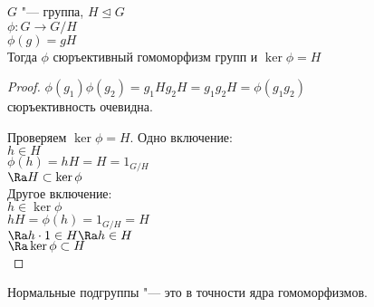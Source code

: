\begin{theorem}
$G$ "--- группа, $H \unlhd G$\\
$\phi \colon G \to G / H$\\
$\phi(g) = gH$ \\

Тогда $\phi$ сюръективный гомоморфизм групп и  $\ker \phi = H$\\
\end{theorem}
\begin{proof}
$\phi(g_1)\phi(g_2) = g_1Hg_2H = g_1g_2H = \phi(g_1g_2)$\\
сюръективность очевидна. 

Проверяем $\ker \phi = H$.
Одно включение:\\
$h \in H$\\
$\phi(h) = hH =  H = 1_{G/H}$\\
$\Ra H \subset \ker \phi$\\

Другое включение:\\
$h \in \ker \phi$\\
$hH = \phi(h) = 1_{G/H} = H$ \\
$\Ra h\cdot1 \in H \Ra h \in H$\\
$\Ra \ker \phi \subset H$\\

\end{proof}

\begin{conseq}
Нормальные подгруппы "--- это в точности ядра гомоморфизмов.
\end{conseq}
